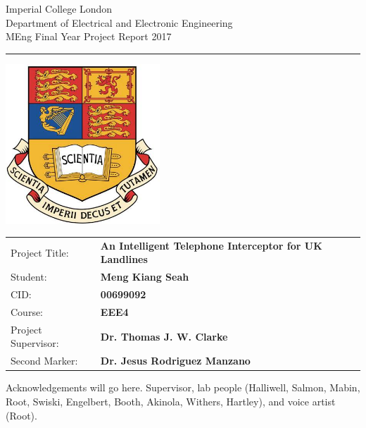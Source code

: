 \documentclass[12pt,a4paper]{report}
\begin{document}
\begin{titlepage}
    \setlength{\parindent}{0pt}
    \setlength{\parskip}{0pt}

    {
    \Large
    \raggedright
    Imperial College London\\[17pt]
    Department of Electrical and Electronic Engineering\\[17pt]
    MEng Final Year Project Report 2017\\[17pt]
    }

    \rule{\columnwidth}{3pt}
    \vfill
    \centering
      \includegraphics[width=0.7\columnwidth,height=60mm,keepaspectratio]{icl.jpg}
    \vfill
    \setlength{\tabcolsep}{0pt}

    \begin{tabular}{p{40mm}p{\dimexpr\columnwidth-40mm}}
	    Project Title: & \textbf{An Intelligent Telephone Interceptor for UK Landlines}\\[12pt]
	    Student: & \textbf{Meng Kiang Seah} \\[12pt]
	    CID: & \textbf{00699092} \\[12pt]
	    Course: & \textbf{EEE4} \\[12pt]
	    Project Supervisor: & \textbf{Dr. Thomas J. W. Clarke} \\[12pt]
	    Second Marker: & \textbf{Dr. Jesus Rodriguez Manzano} \\
    \end{tabular}
\end{titlepage}



\begin{acknowledgments}
 	Acknowledgements will go here. Supervisor, lab people (Halliwell, Salmon, Mabin, Root, Swiski, Engelbert, Booth, Akinola, Withers, Hartley), and voice artist (Root).
\end{acknowledgments}
\end{document}
